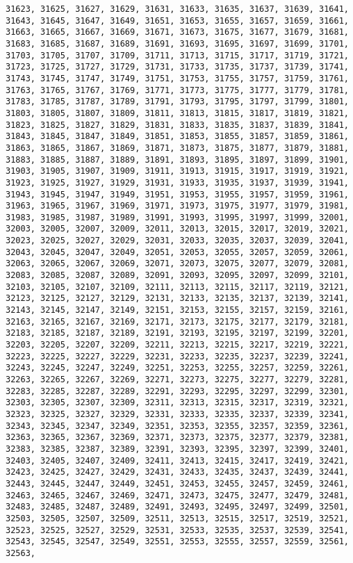 \documentclass[11pt]{article}
\begin{document}
\begin{Verbatim}[commandchars=\\\{\}]
31623, 31625, 31627, 31629, 31631, 31633, 31635, 31637, 31639, 31641, 31643, 31645, 31647, 31649, 31651, 31653, 31655, 31657, 31659, 31661, 31663, 31665, 31667, 31669, 31671, 31673, 31675, 31677, 31679, 31681, 31683, 31685, 31687, 31689, 31691, 31693, 31695, 31697, 31699, 31701, 31703, 31705, 31707, 31709, 31711, 31713, 31715, 31717, 31719, 31721, 31723, 31725, 31727, 31729, 31731, 31733, 31735, 31737, 31739, 31741, 31743, 31745, 31747, 31749, 31751, 31753, 31755, 31757, 31759, 31761, 31763, 31765, 31767, 31769, 31771, 31773, 31775, 31777, 31779, 31781, 31783, 31785, 31787, 31789, 31791, 31793, 31795, 31797, 31799, 31801, 31803, 31805, 31807, 31809, 31811, 31813, 31815, 31817, 31819, 31821, 31823, 31825, 31827, 31829, 31831, 31833, 31835, 31837, 31839, 31841, 31843, 31845, 31847, 31849, 31851, 31853, 31855, 31857, 31859, 31861, 31863, 31865, 31867, 31869, 31871, 31873, 31875, 31877, 31879, 31881, 31883, 31885, 31887, 31889, 31891, 31893, 31895, 31897, 31899, 31901, 31903, 31905, 31907, 31909, 31911, 31913, 31915, 31917, 31919, 31921, 31923, 31925, 31927, 31929, 31931, 31933, 31935, 31937, 31939, 31941, 31943, 31945, 31947, 31949, 31951, 31953, 31955, 31957, 31959, 31961, 31963, 31965, 31967, 31969, 31971, 31973, 31975, 31977, 31979, 31981, 31983, 31985, 31987, 31989, 31991, 31993, 31995, 31997, 31999, 32001, 32003, 32005, 32007, 32009, 32011, 32013, 32015, 32017, 32019, 32021, 32023, 32025, 32027, 32029, 32031, 32033, 32035, 32037, 32039, 32041, 32043, 32045, 32047, 32049, 32051, 32053, 32055, 32057, 32059, 32061, 32063, 32065, 32067, 32069, 32071, 32073, 32075, 32077, 32079, 32081, 32083, 32085, 32087, 32089, 32091, 32093, 32095, 32097, 32099, 32101, 32103, 32105, 32107, 32109, 32111, 32113, 32115, 32117, 32119, 32121, 32123, 32125, 32127, 32129, 32131, 32133, 32135, 32137, 32139, 32141, 32143, 32145, 32147, 32149, 32151, 32153, 32155, 32157, 32159, 32161, 32163, 32165, 32167, 32169, 32171, 32173, 32175, 32177, 32179, 32181, 32183, 32185, 32187, 32189, 32191, 32193, 32195, 32197, 32199, 32201, 32203, 32205, 32207, 32209, 32211, 32213, 32215, 32217, 32219, 32221, 32223, 32225, 32227, 32229, 32231, 32233, 32235, 32237, 32239, 32241, 32243, 32245, 32247, 32249, 32251, 32253, 32255, 32257, 32259, 32261, 32263, 32265, 32267, 32269, 32271, 32273, 32275, 32277, 32279, 32281, 32283, 32285, 32287, 32289, 32291, 32293, 32295, 32297, 32299, 32301, 32303, 32305, 32307, 32309, 32311, 32313, 32315, 32317, 32319, 32321, 32323, 32325, 32327, 32329, 32331, 32333, 32335, 32337, 32339, 32341, 32343, 32345, 32347, 32349, 32351, 32353, 32355, 32357, 32359, 32361, 32363, 32365, 32367, 32369, 32371, 32373, 32375, 32377, 32379, 32381, 32383, 32385, 32387, 32389, 32391, 32393, 32395, 32397, 32399, 32401, 32403, 32405, 32407, 32409, 32411, 32413, 32415, 32417, 32419, 32421, 32423, 32425, 32427, 32429, 32431, 32433, 32435, 32437, 32439, 32441, 32443, 32445, 32447, 32449, 32451, 32453, 32455, 32457, 32459, 32461, 32463, 32465, 32467, 32469, 32471, 32473, 32475, 32477, 32479, 32481, 32483, 32485, 32487, 32489, 32491, 32493, 32495, 32497, 32499, 32501, 32503, 32505, 32507, 32509, 32511, 32513, 32515, 32517, 32519, 32521, 32523, 32525, 32527, 32529, 32531, 32533, 32535, 32537, 32539, 32541, 32543, 32545, 32547, 32549, 32551, 32553, 32555, 32557, 32559, 32561, 32563, 
\end{Verbatim}
\end{document}
